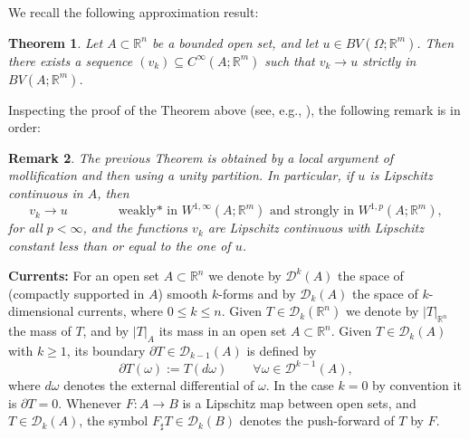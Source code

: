 \documentclass[a4paper,11pt]{article}
\numberwithin{equation}{section}
\newtheorem{theorem}{Theorem}[section]
\newtheorem{remark}[theorem]{Remark}
\newcommand{\Om}{\Omega}
\newcommand{\R}{\mathbb{R}}
\begin{document}
We recall the following approximation result:
\begin{theorem}\label{approx_teoBV}
Let $A\subset\R^n$ be a bounded open set, and let $u\in BV(\Om;\R^m)$. Then there exists a sequence $(v_k)\subseteq C^\infty(A;\R^m)$ such that $v_k\rightarrow u$ strictly in $BV(A;\R^m)$.
\end{theorem}
Inspecting the proof of the Theorem above (see, e.g.,  \cite{AmFuPa:00}), the following remark is in order:
\begin{remark}\label{rem_approximation}
The previous Theorem is obtained by a local argument of mollification and then using a unity partition. In particular, if $u$ is Lipschitz continuous in $A$, then
$$v_k\rightarrow u\qquad \qquad \text{weakly* in }W^{1,\infty}(A;\R^{m})\text{ and strongly in }W^{1,p}(A;\R^m),$$  
for all $p<\infty$, 
and the functions $v_k$ are Lipschitz continuous with Lipschitz constant less than or equal to the one of $u$. 
\end{remark}
\medskip

\textbf{Currents:} 
For an open set $A\subset \R^n$ we denote by $\mathcal D^k(A)$ the 
space of (compactly 
supported in $A$) smooth $k$-forms and by $\mathcal D_k(A)$ the space of $k$-dimensional currents, where $0\leq k\leq n$. Given $T\in \mathcal D_k(\R^n)$ we denote by $\vert T\vert_{\R^n}$  the mass of $T$, and by $\vert T\vert_A$ 
its mass in an open set $A\subset \R^n$.
%
Given $T\in \mathcal D_k(A)$ with  $k\geq 1$, its 
 boundary $\partial T\in \mathcal D_{k-1}(A)$ 
is defined by 
$$\partial T(\omega):=T(d \omega)\qquad  \forall\omega\in \mathcal D^{k-1}(A),$$
where $d\omega$ denotes the external differential of $\omega$. 
In the case $k=0$ by convention it is $\partial T=0$.
Whenever $F:A\rightarrow B$ is a Lipschitz 
map between open sets, and $T\in \mathcal D_k(A)$, the symbol $F_\sharp T\in \mathcal D_k(B)$ denotes the push-forward of $T$ by $F$.
%
\end{document}
